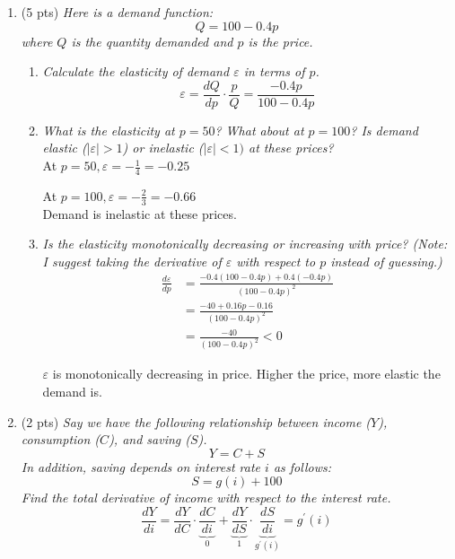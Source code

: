 \documentclass{./../../Latex/tests}
\begin{document}
\begin{enumerate}
\vspace{1cm}

\item (5 pts) \textit{Here is a demand function:}
 $$ Q = 100-0.4p$$
\textit{ where $Q$ is the quantity demanded and $p$ is the price. }
 \begin{enumerate}
  \item  \textit{Calculate the elasticity of demand $\varepsilon$ in terms of $p$.}
   $$\varepsilon=\frac{d Q}{d p} \cdot \frac{p}{Q}=\frac{-0.4 p}{100-0.4 p}$$
   
  \item \textit{What is the elasticity at $p=50$? What about at $p=100$? Is demand elastic ($|\varepsilon|>1$) or inelastic ($|\varepsilon|<1)$ at these prices?} \\
 
At  $p=50, \varepsilon=-\frac{1}{4}=-0.25$

At $p=100, \varepsilon=-\frac{2}{3}=-0.66$ \\
Demand is inelastic at these prices. \\

 \item \textit{Is the elasticity monotonically decreasing or increasing with price? (Note: I suggest taking the derivative of $\varepsilon$ with respect to $p$ instead of guessing.)} \\ 
 $$
\begin{aligned}
\frac{d \varepsilon}{d p}&=\frac{-0.4(100-0.4 p)+0.4(-0.4 p)}{(100-0.4 p)^{2}} \\
&=\frac{-40+0.16 p-0.16}{(100-0.4 p)^{2}} \\&=\frac{-40}{(100-0.4 p)^{2}}<0
\end{aligned}
$$

$\varepsilon$ is monotonically decreasing in price. Higher the price, more elastic the demand is.
\end{enumerate}

\vspace{2cm}

\item (2 pts) \textit{Say we have the following relationship between income ($Y$), consumption ($C$), and saving ($S$). }
$$ Y= C+S$$
\textit{In addition, saving depends on interest rate $i$ as follows:}
$$ S = g(i)+100 $$
\textit{Find the total derivative of income with respect to the interest rate. }
 $$\frac{d Y}{d i}=\frac{d Y}{d C} \cdot \underbrace{\frac{d C}{d i}}_{0}+\underbrace{\frac{d Y}{d S}}_{1} \cdot \underbrace{\frac{d S}{d i}}_{g^{\prime}(i)} = g^{\prime}(i)$$
\end{enumerate}
\end{document}
